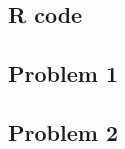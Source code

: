 \begin{appendices}
    \section{R code}

        \subsection*{Problem 1}

        \subsection*{Problem 2}
\end{appendices}
